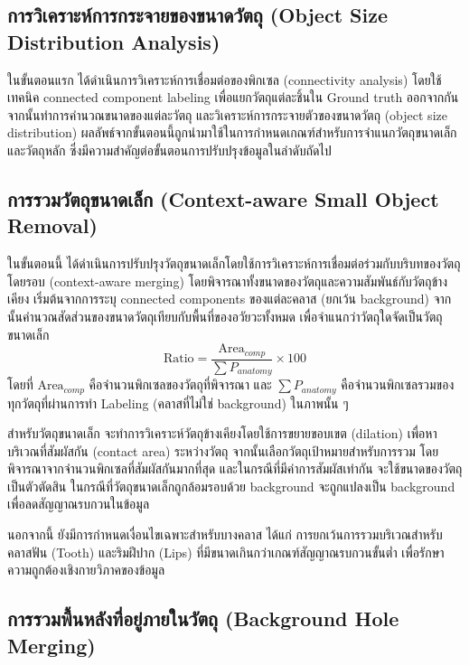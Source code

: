\subsection{การวิเคราะห์การกระจายของขนาดวัตถุ (Object Size Distribution Analysis)}

ในขั้นตอนแรก ได้ดำเนินการวิเคราะห์การเชื่อมต่อของพิกเซล (connectivity analysis) โดยใช้เทคนิค connected component labeling เพื่อแยกวัตถุแต่ละชิ้นใน Ground truth ออกจากกัน จากนั้นทำการคำนวณขนาดของแต่ละวัตถุ และวิเคราะห์การกระจายตัวของขนาดวัตถุ (object size distribution)
ผลลัพธ์จากขั้นตอนนี้ถูกนำมาใช้ในการกำหนดเกณฑ์สำหรับการจำแนกวัตถุขนาดเล็กและวัตถุหลัก ซึ่งมีความสำคัญต่อขั้นตอนการปรับปรุงข้อมูลในลำดับถัดไป

\subsection{การรวมวัตถุขนาดเล็ก (Context-aware Small Object Removal)}

ในขั้นตอนนี้ ได้ดำเนินการปรับปรุงวัตถุขนาดเล็กโดยใช้การวิเคราะห์การเชื่อมต่อร่วมกับบริบทของวัตถุโดยรอบ (context-aware merging) โดยพิจารณาทั้งขนาดของวัตถุและความสัมพันธ์กับวัตถุข้างเคียง
เริ่มต้นจากการระบุ connected components ของแต่ละคลาส (ยกเว้น background) จากนั้นคำนวณสัดส่วนของขนาดวัตถุเทียบกับพื้นที่ของอวัยวะทั้งหมด เพื่อจำแนกว่าวัตถุใดจัดเป็นวัตถุขนาดเล็ก
\begin{equation}
\text{Ratio} = \frac{\text{Area}_{comp}}{\sum P_{anatomy}} \times 100
\end{equation}
โดยที่ $\text{Area}_{comp}$ คือจำนวนพิกเซลของวัตถุที่พิจารณา และ $\sum P_{anatomy}$ คือจำนวนพิกเซลรวมของทุกวัตถุที่ผ่านการทำ Labeling (คลาสที่ไม่ใช่ background) ในภาพนั้น ๆ

สำหรับวัตถุขนาดเล็ก จะทำการวิเคราะห์วัตถุข้างเคียงโดยใช้การขยายขอบเขต (dilation) เพื่อหาบริเวณที่สัมผัสกัน (contact area) ระหว่างวัตถุ จากนั้นเลือกวัตถุเป้าหมายสำหรับการรวม โดยพิจารณาจากจำนวนพิกเซลที่สัมผัสกันมากที่สุด และในกรณีที่มีค่าการสัมผัสเท่ากัน จะใช้ขนาดของวัตถุเป็นตัวตัดสิน
ในกรณีที่วัตถุขนาดเล็กถูกล้อมรอบด้วย background จะถูกแปลงเป็น background เพื่อลดสัญญาณรบกวนในข้อมูล

นอกจากนี้ ยังมีการกำหนดเงื่อนไขเฉพาะสำหรับบางคลาส ได้แก่ การยกเว้นการรวมบริเวณสำหรับคลาสฟัน (Tooth) และริมฝีปาก (Lips) ที่มีขนาดเกินกว่าเกณฑ์สัญญาณรบกวนขั้นต่ำ เพื่อรักษาความถูกต้องเชิงกายวิภาคของข้อมูล


\subsection{การรวมพื้นหลังที่อยู่ภายในวัตถุ (Background Hole Merging)}

